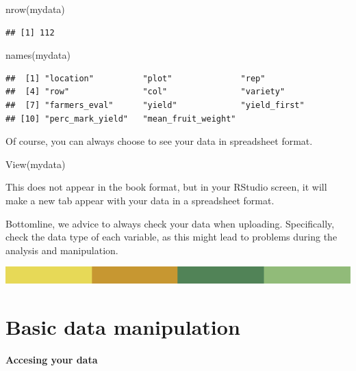\documentclass[
]{book}
\newenvironment{Shaded}{\begin{snugshade}}{\end{snugshade}}
\newcommand{\FunctionTok}[1]{\textcolor[rgb]{0.00,0.00,0.00}{#1}}
\newcommand{\NormalTok}[1]{#1}
\begin{document}
\begin{Shaded}
\begin{Highlighting}[]
\FunctionTok{nrow}\NormalTok{(mydata)}
\end{Highlighting}
\end{Shaded}

\begin{verbatim}
## [1] 112
\end{verbatim}

\begin{Shaded}
\begin{Highlighting}[]
\FunctionTok{names}\NormalTok{(mydata)}
\end{Highlighting}
\end{Shaded}

\begin{verbatim}
##  [1] "location"          "plot"              "rep"              
##  [4] "row"               "col"               "variety"          
##  [7] "farmers_eval"      "yield"             "yield_first"      
## [10] "perc_mark_yield"   "mean_fruit_weight"
\end{verbatim}

Of course, you can always choose to see your data in spreadsheet format.

\begin{Shaded}
\begin{Highlighting}[]
\FunctionTok{View}\NormalTok{(mydata)}
\end{Highlighting}
\end{Shaded}

This does not appear in the book format, but in your RStudio screen, it will make a new tab appear with your data in a spreadsheet format.

Bottomline, we advice to always check your data when uploading. Specifically, check the data type of each variable, as this might lead to problems during the analysis and manipulation.

\includegraphics{rsrstrip.png}

\hypertarget{basic-data-manipulation}{%
\section{Basic data manipulation}\label{basic-data-manipulation}}

\textbf{Accesing your data }
\end{document}

